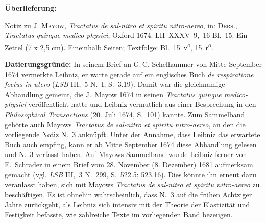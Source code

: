 %
%
%
%
%
\frenchspacing%
%
\begin{ledgroupsized}[r]{120mm}%
\footnotesize%
\pstart%
\noindent\textbf{Überlieferung:}%
\pend%
\end{ledgroupsized}%
\begin{ledgroupsized}[r]{114mm}%
\footnotesize%
\pstart%
\parindent -6mm%
%
Notiz zu \textsc{J. Mayow}, \textit{Tractatus de sal-nitro et spiritu nitro-aereo}, in: \textsc{Ders.}, \textit{Tractatus quinque medico-physici}, Oxford 1674:\cite{01997}
LH~XXXV~9,~16 Bl.~15.
Ein Zettel (7 x 2,5 cm).
Eineinhalb Seiten;
Textfolge: Bl.~15~v\textsuperscript{o}, 15~r\textsuperscript{o}.%
\pend%
\end{ledgroupsized}%
%
\vspace{5mm}%
\begin{ledgroup}%
\footnotesize%
\pstart%
\noindent\textbf{Datierungsgründe:}
In seinem Brief an G.\,C. Schelhammer\protect{} von Mitte September 1674 vermerkte Leibniz, er warte gerade auf ein englisches Buch \textit{de respiratione foetus in utero} (\textit{LSB} III,~5 N.~I, S.~3.19\cite{01293}).
Damit war die gleichnamige Abhandlung gemeint,\cite{01296} die J.~Mayow\protect{} 1674 in seinen \textit{Tractatus quinque medico-physici} veröffentlicht hatte und Leibniz vermutlich aus einer Besprechung in den \textit{Philosophical Trans\-ac\-ti\-ons} (20. Juli 1674, S.~101\cite{01295}) kannte.
Zum Sammelband gehörte auch Mayows \textit{Tractatus de sal-nitro et spiritu nitro-aereo}\cite{01997}, an den die vorliegende Notiz N.~3 anknüpft.
Unter der Annahme, dass Leibniz das erwartete Buch auch empfing, kann er ab Mitte September 1674 diese Abhandlung gelesen und N.~3 verfasst haben.
\pend%
\pstart
Auf Mayows Sammelband wurde Leibniz ferner von F.~Schrader\protect{} in einem Brief vom 28. November (8. Dezember) 1681 aufmerksam gemacht (vgl. \textit{LSB} III,~3 N.~299, S.~522.5; 523.16\cite{01294}).
Dies könnte ihn erneut dazu veranlasst haben, sich mit Mayows \textit{Tractatus de sal-nitro et spiritu nitro-aereo} zu beschäftigen.
Es ist ohnehin wahrscheinlich, dass N.~3 auf die frühen Achtziger Jahre zurückgeht, als Leibniz sich intensiv mit der Theorie der Elastizität und Festigkeit befasste, wie zahlreiche Texte im vorliegenden Band bezeugen. 
\pend%
\end{ledgroup}%
